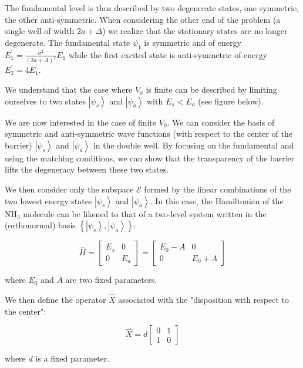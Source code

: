 \documentclass{article}
\begin{document}
The fundamental level is thus described by two degenerate states, one symmetric, the other anti-symmetric. When considering the other end of the problem (a single well of width $2a + \Delta$) we realize that the stationary states are no longer degenerate. The fundamental state $\psi_{1}$ is symmetric and of energy $E_{1}^{\prime} = \frac{a^{2}}{(2a + \Delta)^{2}} E_{1}$ while the first excited state is anti-symmetric of energy $E_{2}^{\prime} = 4 E_{1}^{\prime}$.

We understand that the case where $V_{0}$ is finite can be described by limiting ourselves to two states $\left|\psi_{s}\right\rangle$ and $\left|\psi_{a}\right\rangle$ with $E_{s} < E_{a}$ (see figure below).

We are now interested in the case of finite $V_{0}$. We can consider the basis of symmetric and anti-symmetric wave functions (with respect to the center of the barrier) $\left|\psi_{s}\right\rangle$ and $\left|\psi_{a}\right\rangle$ in the double well. By focusing on the fundamental and using the matching conditions, we can show that the transparency of the barrier lifts the degeneracy between these two states.

We then consider only the subspace $\mathcal{E}$ formed by the linear combinations of the two lowest energy states $\left|\psi_{s}\right\rangle$ and $\left|\psi_{a}\right\rangle$. In this case, the Hamiltonian of the $\mathrm{NH}_{3}$ molecule can be likened to that of a two-level system written in the (orthonormal) basis $\left\{\left|\psi_{s}\right\rangle, \left|\psi_{a}\right\rangle\right\}$:

$$
\hat{H} = \begin{bmatrix}
E_{s} & 0 \\
0 & E_{a}
\end{bmatrix} = \begin{bmatrix}
E_{0} - A & 0 \\
0 & E_{0} + A
\end{bmatrix}
$$

where $E_{0}$ and $A$ are two fixed parameters.

We then define the operator $\hat{X}$ associated with the "disposition with respect to the center":

$$
\hat{X} = d \begin{bmatrix}
0 & 1 \\
1 & 0
\end{bmatrix}
$$

where $d$ is a fixed parameter.
\end{document}
